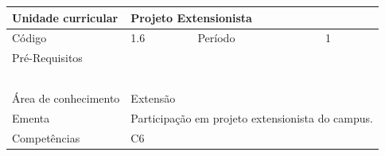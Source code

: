 \clearpage
\newpage

\begin{quadro}[ht!]
  \centering\scriptsize
\caption{Unidade Curricular Projeto Extensionista}

\begin{tabular}{|p{2.5cm}|p{2.5cm}|p{2.5cm}|p{2.5cm}|p{2.5cm}|}\hline

  Unidade curricular & \multicolumn{4}{p{10cm}|}{ Projeto Extensionista }\\\hline
  Código & 1.6 & Período & \multicolumn{2}{p{5cm}|}{ 1 }\\\hline
  Pré-Requisitos & \multicolumn{4}{p{10cm}|}{  } \\\hline
  \cellcolor{blue1}{ CH PRESENCIAL } &
    \cellcolor{blue1}{CH EAD Síncrona} &
    \cellcolor{blue1}{CH EAD Síncrona Mediada} &
    \cellcolor{blue1}{CH EAD Assíncrona} &
    \cellcolor{blue1}{CH APCC} \\\hline
  \cellcolor{blue1}{ 120 } &
    \cellcolor{blue1}{ 0 } &
    \cellcolor{blue1}{ 0 } &
    \cellcolor{blue1}{ 0 } &
    \cellcolor{blue1}{0} \\\hline
  \cellcolor{blue1}{ CH Teórica } &
    \cellcolor{blue1}{CH Prática} &
    \cellcolor{blue1}{CH Humanidades} &
    \cellcolor{blue1}{CH Extensão} &
    \cellcolor{blue1}{CH EAD TOTAL} \\\hline
  \cellcolor{blue1}{ 0 } &
    \cellcolor{blue1}{ 0 } &
    \cellcolor{blue1}{ 0 } &
    \cellcolor{blue1}{ 120 } &
    \cellcolor{blue1}{ 0 } \\\hline
  \cellcolor{blue1}{CARGA-HORÁRIA TOTAL} & \multicolumn{4}{p{10cm}|}{ \cellcolor{blue1}{ 120 } } \\\hline
  Área de conhecimento & \multicolumn{4}{p{10cm}|}{ Extensão } \\\hline
  Ementa & \multicolumn{4}{p{10cm}|}{ Participação em projeto extensionista do campus. } \\\hline
  Competências & \multicolumn{4}{p{10cm}|}{ C6 } \\\hline


  
	\end{tabular}

\end{quadro}


\clearpage
\newpage

